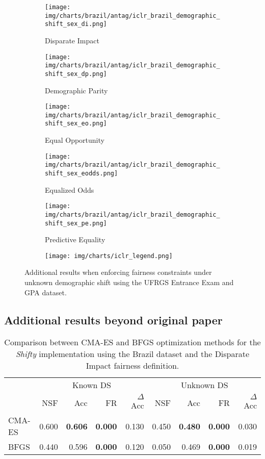 \begin{figure}[h]
    \begin{subfigure}[b]{1\linewidth}
        \texttt{[image: img/charts/brazil/antag/iclr\_brazil\_demographic\_shift\_sex\_di.png]}
        \caption{Disparate Impact}
    \end{subfigure} 
    \begin{subfigure}[b]{1\linewidth}
        \texttt{[image: img/charts/brazil/antag/iclr\_brazil\_demographic\_shift\_sex\_dp.png]}
        \caption{Demographic Parity}
    \end{subfigure}
    \begin{subfigure}[b]{1\linewidth}
        \texttt{[image: img/charts/brazil/antag/iclr\_brazil\_demographic\_shift\_sex\_eo.png]}
        \caption{Equal Opportunity}
    \end{subfigure} 
    \begin{subfigure}[b]{1\linewidth}
        \texttt{[image: img/charts/brazil/antag/iclr\_brazil\_demographic\_shift\_sex\_eodds.png]}
        \caption{Equalized Odds}
    \end{subfigure} 
    \begin{subfigure}[b]{1\linewidth}
        \texttt{[image: img/charts/brazil/antag/iclr\_brazil\_demographic\_shift\_sex\_pe.png]}
        \caption{Predictive Equality}
    \end{subfigure} 
   \begin{subfigure}[b]{1\linewidth}
        \texttt{[image: img/charts/iclr\_legend.png]}
    \end{subfigure} 
    \caption{Additional results when enforcing fairness constraints under unknown demographic shift
using the UFRGS Entrance Exam and GPA dataset.
}
\end{figure}
\clearpage

\subsection{Additional results beyond original paper}
\label{add_beyond}

 
\begin{table}[H]
\centering
\label{di_brazil_optimizer}
\begin{tabular}{lrrrrrrrr}
\toprule
 & \multicolumn{4}{c}{Known DS} & \multicolumn{4}{c}{Unknown DS} \\
 & NSF & Acc & FR & $\Delta$ Acc & NSF & Acc & FR & $\Delta$ Acc \\
\cmidrule(r){2-5} \cmidrule{6-9}
CMA-ES & 0.600 & \bfseries 0.606 & \bfseries 0.000 & 0.130 & 0.450 & \bfseries 0.480 & \bfseries 0.000 & 0.030 \\
BFGS & 0.440 & 0.596 & \bfseries 0.000 & 0.120 & 0.050 & 0.469 & \bfseries 0.000 & 0.019 \\
\bottomrule
\end{tabular}
\caption{Comparison between CMA-ES and BFGS optimization methods for the \textit{Shifty} implementation using the Brazil dataset and the Disparate Impact fairness definition.}
\end{table}

